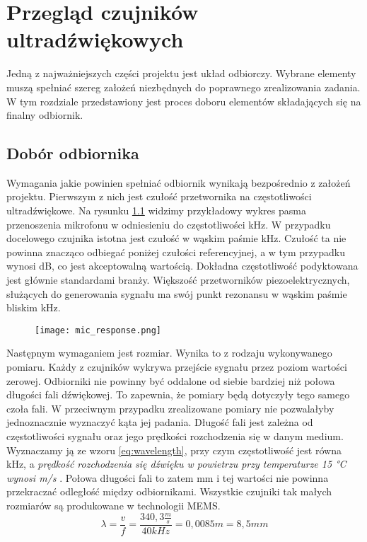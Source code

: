 \chapter[Przegląd czujników ultradźwiękowych]{Przegląd czujników ultradźwiękowych}

\label{chapter:przeglad_czujnikow}
Jedną z najważniejszych części projektu jest układ odbiorczy. 
Wybrane elementy muszą spełniać szereg założeń niezbędnych do poprawnego zrealizowania zadania. 
W tym rozdziale przedstawiony jest proces doboru elementów składających się na finalny odbiornik.




\section{Dobór odbiornika}
Wymagania jakie powinien spełniać odbiornik wynikają bezpośrednio z założeń projektu. 
Pierwszym z nich jest czułość przetwornika na częstotliwości ultradźwiękowe. Na rysunku \ref{fig:mic_response} 
widzimy przykładowy wykres pasma przenoszenia mikrofonu w odniesieniu do częstotliwości \unit[1]{kHz}. 
W przypadku docelowego czujnika istotna jest czułość w wąskim paśmie \unit[40]{kHz}. 
Czułość ta nie powinna znacząco odbiegać poniżej czułości referencyjnej, a w tym przypadku wynosi \unit[-2]{dB}, co jest akceptowalną wartością.
Dokładna częstotliwość podyktowana jest głównie standardami branży. Większość przetworników piezoelektrycznych, 
służących do generowania sygnału ma swój punkt rezonansu w wąskim paśmie bliskim \unit[40]{kHz}.

\begin{figure}[ht!]
    \centering
    \texttt{[image: mic\_response.png]}
    \label{fig:mic_response}
\end{figure}

\noindent

Następnym wymaganiem jest rozmiar. 
Wynika to z rodzaju wykonywanego pomiaru. Każdy z czujników wykrywa przejście sygnału przez poziom wartości zerowej. 
Odbiorniki nie powinny być oddalone od siebie bardziej niż połowa długości fali dźwiękowej. 
To zapewnia, że pomiary będą dotyczyły tego samego czoła fali. W przeciwnym przypadku zrealizowane pomiary nie pozwalałyby jednoznacznie wyznaczyć kąta jej padania.
Długość fali jest zależna od częstotliwości sygnału oraz jego prędkości rozchodzenia się w danym medium. 
Wyznaczamy ją ze wzoru \ref{eq:wavelength}, przy czym częstotliwość jest równa \unit[40]{kHz},
a {\em prędkość rozchodzenia się dźwięku w powietrzu przy temperaturze 15 °C wynosi \unit[340,3]{m/s}} \cite{sound_speed}.
Połowa długości fali to zatem \unit[4,25]{mm} i tej wartości nie powinna przekraczać odległość między odbiornikami.
Wszystkie czujniki tak małych rozmiarów są produkowane w technologii MEMS. 
\begin{equation}
\lambda = \frac{v}{f} = \frac{340,3\frac{m}{s}}{40kHz}=0,0085m = 8,5mm
\label{eq:wavelength}    
\end{equation}

